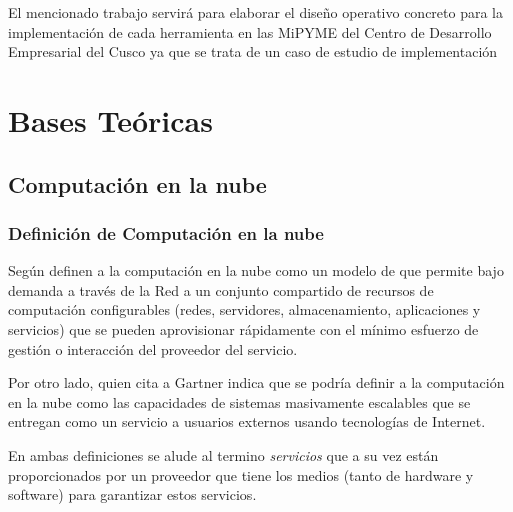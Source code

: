 El mencionado trabajo servirá para elaborar el diseño operativo concreto para la
implementación de cada herramienta en las MiPYME del Centro de Desarrollo
Empresarial del Cusco ya que se trata de un caso de estudio de implementación

\section{Bases Teóricas}

\subsection{Computación en la nube}

\subsubsection{Definición de Computación en la nube}
Según \cite{nist} definen a la computación en la nube como un modelo de
que permite bajo demanda a través de la Red a un conjunto compartido de recursos
de computación configurables (redes, servidores, almacenamiento, aplicaciones y servicios)
que se pueden aprovisionar rápidamente con el mínimo esfuerzo de gestión o interacción
del proveedor del servicio.

Por otro lado, \cite{msolutions} quien cita a Gartner indica que se podría definir a la
computación en la nube como las capacidades de sistemas masivamente escalables que se entregan
como un servicio a usuarios externos usando tecnologías de Internet.

En ambas definiciones se alude al termino \emph{servicios} que a su vez están proporcionados
por un proveedor que tiene los medios (tanto de hardware y software) para garantizar estos servicios.

